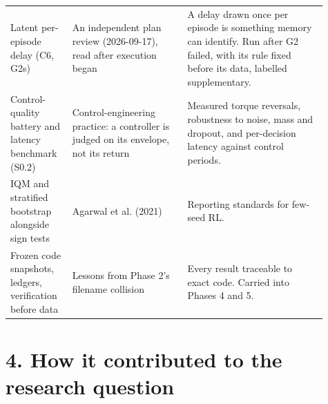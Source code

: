 \documentclass[11pt]{article}
\begin{document}
\begin{center}
\begin{tabular}{>{\raggedright\arraybackslash}p{0.172\linewidth}>{\raggedright\arraybackslash}p{0.331\linewidth}>{\raggedright\arraybackslash}p{0.403\linewidth}}
Latent per-episode delay (C6, G2s) & An independent plan review (2026-09-17), read after execution began & A delay drawn once per episode is something memory can identify. Run after G2 failed, with its rule fixed before its data, labelled supplementary. \\
Control-quality battery and latency benchmark (S0.2) & Control-engineering practice: a controller is judged on its envelope, not its return & Measured torque reversals, robustness to noise, mass and dropout, and per-decision latency against control periods. \\
IQM and stratified bootstrap alongside sign tests & Agarwal et al. (2021) & Reporting standards for few-seed RL. \\
Frozen code snapshots, ledgers, verification before data & Lessons from Phase 2's filename collision & Every result traceable to exact code. Carried into Phases 4 and 5. \\
\bottomrule
\end{tabular}\end{center}



\section*{4. How it contributed to the research question}
\end{document}

